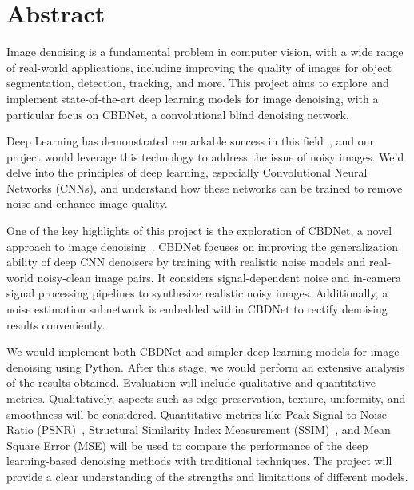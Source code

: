 
\section{Abstract}\label{sec:abstract}

    Image denoising is a fundamental problem in computer vision, with a wide range of real-world applications,
    including improving the quality of images for object segmentation, detection, tracking, and more.
    This project aims to explore and implement state-of-the-art deep learning models for image denoising,
    with a particular focus on CBDNet, a convolutional blind denoising network.

    Deep Learning has demonstrated remarkable success in this field~\cite{9057895},
    and our project would leverage this technology to address the issue of noisy images.
    We’d delve into the principles of deep learning, especially Convolutional Neural Networks (CNNs),
    and understand how these networks can be trained to remove noise and enhance image quality.

    One of the key highlights of this project is the exploration of CBDNet, a novel approach to image denoising~\cite{guo2019convolutional}.
    CBDNet focuses on improving the generalization ability of deep CNN denoisers by training with realistic noise models and real-world noisy-clean image pairs.
    It considers signal-dependent noise and in-camera signal processing pipelines to synthesize realistic noisy images.
    Additionally, a noise estimation subnetwork is embedded within CBDNet to rectify denoising results conveniently.

    We would implement both CBDNet and simpler deep learning models for image denoising using Python.
    After this stage, we would perform an extensive analysis of the results obtained.
    Evaluation will include qualitative and quantitative metrics.
    Qualitatively, aspects such as edge preservation, texture, uniformity, and smoothness will be considered.
    Quantitative metrics like Peak Signal-to-Noise Ratio (PSNR)~\cite{NI_official_website_2023},
    Structural Similarity Index Measurement (SSIM)~\cite{1284395},
    and Mean Square Error (MSE) will be used to compare the performance of the deep learning-based denoising methods with traditional techniques.
    The project will provide a clear understanding of the strengths and limitations of different models.
